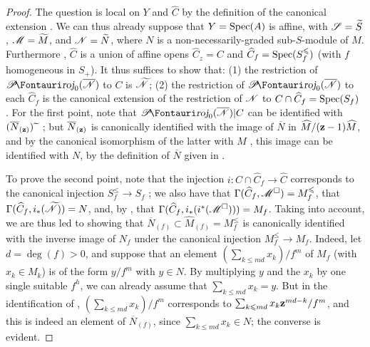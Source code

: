 \begin{proof}
The question is local on $Y$ and $\widehat{C}$ by the definition of the canonical extension .
We can thus already suppose that $Y=\operatorname{Spec}(A)$ is affine, with $\mathscr{S}=\widetilde{S}$, $\mathscr{M}=\widetilde{M}$, and $\mathscr{N}=\widetilde{N}$, where $N$ is a non-necessarily-graded sub-$S$-module of $M$.
Furthermore , $\widehat{C}$ is a union of affine opens $\widehat{C}_z=C$ and $\widehat{C}_f=\operatorname{Spec}(S_f^\leqslant)$ (with $f$ homogeneous in $S_+$).
It thus suffices to show that: (1) the restriction of $\shProj_0(\overline{\sh{N}})$ to $C$ is $\widetilde{\mathscr{N}}$; (2) the restriction of $\shProj_0(\overline{\sh{N}})$ to each $\widehat{C}_f$ is the canonical extension of the restriction of $\mathscr{N}$ to $C\cap\widehat{C}_f=\operatorname{Spec}(S_f)$ .
For the first point, note that $\shProj_0(\overline{\sh{N}})|C$ can be identified with $(\overline{N}_{(\mathbf{z})}){\,\widetilde{\,}\,}$ ;
but $\overline{N}_{(\mathbf{z})}$ is canonically identified  with the image of $\overline{N}$ in $\widehat{M}/(\mathbf{z}-1)\widehat{M}$, and by the canonical isomorphism of the latter with $M$ , this image can be identified with $N$, by the definition of $\overline{N}$ given in .

To prove the second point, note that the injection $i:C\cap\widehat{C}_f\to\widehat{C}$ corresponds to the canonical injection $S_f^\leq\to S_f$ ;
we also have that $\Gamma(\widehat{C}_f,\mathscr{M}^\square)=M_f^\leqslant$, that $\Gamma(\widehat{C}_f,i_*(\widetilde{\mathscr{N}}))=N$, and, by , that $\Gamma(\widehat{C}_f,i_*(i^*(\mathscr{M}^\square)))=M_f$.
Taking  into account, we are thus led to showing that $\overline{N}_{(f)}\subset\widehat{M}_{(f)}=M_f^\leq$ is canonically identified with the inverse image of $N_f$ under the canonical injection $M_f^\leq\to M_f$.
Indeed, let $d=\deg(f)>0$, and suppose that an element $(\sum_{k\leq md}x_k)/f^m$ of $M_f$ (with $x_k\in M_k$) is of the form $y/f^m$ with $y\in N$.
By multiplying $y$ and the $x_k$ by one single suitable $f^h$, we can already assume that $\sum_{k\leq md}x_k=y$.
But in the identification of , $(\sum_{k\leq md}x_k)/f^m$ corresponds to $\sum_{k\leqslant md}x_k\mathbf{z}^{md-k}/f^m$, and this is indeed an element of $\overline{N}_{(f)}$, since $\sum_{k\leq md}x_k\in N$;
the converse is evident.
\end{proof}

